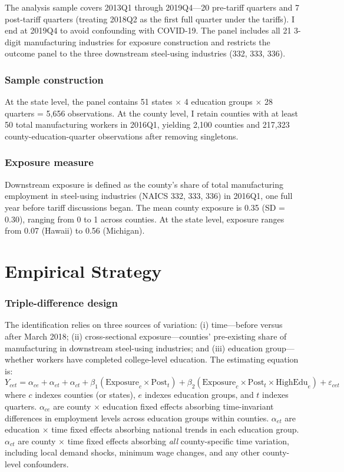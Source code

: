 \documentclass[12pt]{article}
\begin{document}
The analysis sample covers 2013Q1 through 2019Q4---20 pre-tariff quarters and 7 post-tariff quarters (treating 2018Q2 as the first full quarter under the tariffs). I end at 2019Q4 to avoid confounding with COVID-19. The panel includes all 21 3-digit manufacturing industries for exposure construction and restricts the outcome panel to the three downstream steel-using industries (332, 333, 336).

\subsubsection*{Sample construction} At the state level, the panel contains 51 states $\times$ 4 education groups $\times$ 28 quarters = 5,656 observations. At the county level, I retain counties with at least 50 total manufacturing workers in 2016Q1, yielding 2,100 counties and 217,323 county-education-quarter observations after removing singletons.

\subsubsection*{Exposure measure} Downstream exposure is defined as the county's share of total manufacturing employment in steel-using industries (NAICS 332, 333, 336) in 2016Q1, one full year before tariff discussions began. The mean county exposure is 0.35 (SD = 0.30), ranging from 0 to 1 across counties. At the state level, exposure ranges from 0.07 (Hawaii) to 0.56 (Michigan).



\section{Empirical Strategy}

\subsubsection*{Triple-difference design} The identification relies on three sources of variation: (i) time---before versus after March 2018; (ii) cross-sectional exposure---counties' pre-existing share of manufacturing in downstream steel-using industries; and (iii) education group---whether workers have completed college-level education. The estimating equation is:
\begin{equation}
Y_{cet} = \alpha_{ce} + \alpha_{et} + \alpha_{ct} + \beta_1 (\text{Exposure}_c \times \text{Post}_t) + \beta_2 (\text{Exposure}_c \times \text{Post}_t \times \text{HighEdu}_e) + \varepsilon_{cet}
\label{eq:ddd}
\end{equation}
where $c$ indexes counties (or states), $e$ indexes education groups, and $t$ indexes quarters. $\alpha_{ce}$ are county $\times$ education fixed effects absorbing time-invariant differences in employment levels across education groups within counties. $\alpha_{et}$ are education $\times$ time fixed effects absorbing national trends in each education group. $\alpha_{ct}$ are county $\times$ time fixed effects absorbing \emph{all} county-specific time variation, including local demand shocks, minimum wage changes, and any other county-level confounders.
\end{document}
